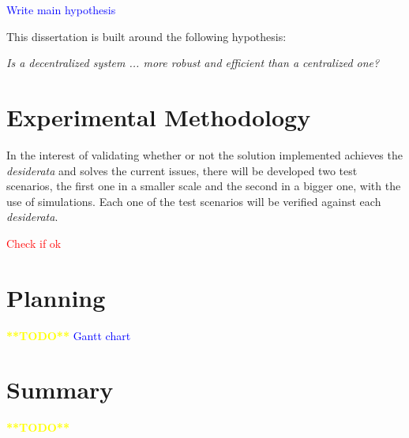 \textcolor{blue}{Write main hypothesis}

This dissertation is built around the following hypothesis:

\textit{Is a decentralized system ... more robust and efficient than a centralized one?}

\section{Experimental Methodology}\label{sec:exp_meth}

In the interest of validating whether or not the solution implemented achieves the \emph{desiderata} and solves the current issues, there will be developed two test scenarios, the first one in a smaller scale and the second in a bigger one, with the use of simulations. Each one of the test scenarios will be verified against each \emph{desiderata}. 

\textcolor{red}{Check if ok}

\section{Planning}\label{sec:planning}

\textcolor{yellow}{\textbf{**TODO**}}
\textcolor{blue}{Gantt chart}

\section{Summary}\label{sec:stat_summary}

\textcolor{yellow}{\textbf{**TODO**}}
